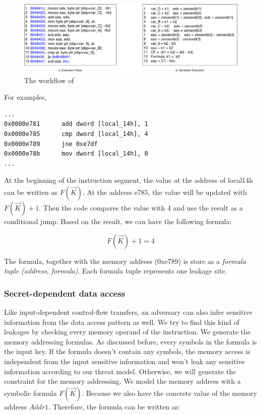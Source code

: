 \begin{figure}[ht]
      \centering
      \includegraphics[width=\columnwidth]{./figures/secretCF.pdf}
      \caption{The workflow of \tool{}}
      \label{fig:Test}
  \end{figure}

For examples,

\begin{lstlisting}
...
0x0000e781      add dword [local_14h], 1
0x0000e785      cmp dword [local_14h], 4
0x0000e789      jne 0xe7df
0x0000e78b      mov dword [local_14h], 0
...
\end{lstlisting}

At the beginning of the instruction segment, the value at the 
address of local14h can be written as $F(\vec{K})$. At the address e785, 
the value will be updated with $F(\vec{K})+1$. Then the code compares 
the value with 4 and use the result as a conditional jump. 
Based on the result, we can have the following formula:

$$F(\vec{K}) + 1 = 4$$

The formula, together with the memory address (0xe789) is store
as a \textit{formula tuple (address, formula)}. 
Each formula tuple represents one leakage site.

\subsubsection{Secret-dependent data access}
Like input-dependent control-flow transfers, an adversary can also infer 
sensitive information from the data access pattern as well. 
We try to find this kind of leakages by checking 
every memory operand of the instruction. We generate the memory addressing 
formulas. As discussed before, every symbols in the formula is the input key. 
If the formula doesn’t contain any symbols, the memory access is independent 
from the input sensitive information and won’t leak any sensitive information 
according to our threat model. Otherwise, we will generate the constraint for
the memory addressing. We model the memory address with a symbolic formula 
$F(\vec{K})$. 
Because we also have the concrete value of the memory address $Addr1$. Therefore,
the formula can be written as:

